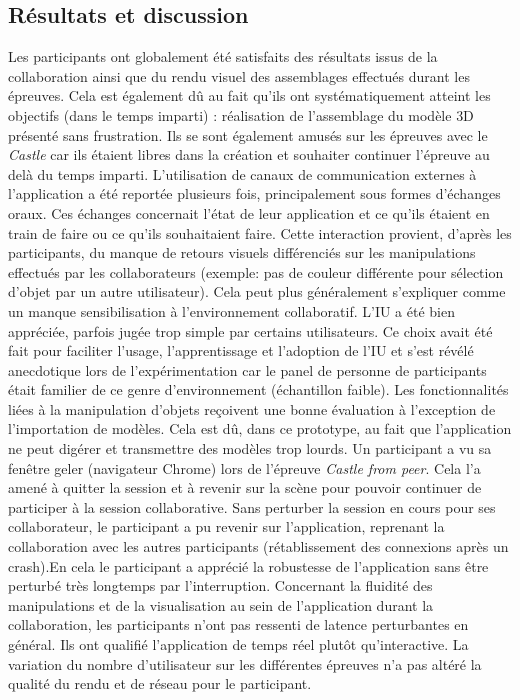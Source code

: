 \subsection{Résultats et discussion}
Les participants ont globalement été satisfaits des résultats issus de la 
collaboration ainsi que du rendu visuel des assemblages effectués durant les 
épreuves. Cela est également dû au fait qu'ils ont systématiquement atteint les 
objectifs (dans le temps imparti) : réalisation de l'assemblage du modèle \gls{3D} 
présenté sans frustration. Ils se sont également \og amusés\fg{} sur les épreuves
avec le \textit{Castle} car ils étaient libres dans la création et souhaiter continuer 
l'épreuve au delà du temps imparti. L'utilisation de canaux de communication 
externes à l'application a été reportée plusieurs fois, principalement sous formes 
d'échanges oraux. Ces échanges concernait l'état de leur application et ce qu'ils 
étaient en train de faire ou ce qu'ils souhaitaient faire. Cette interaction provient, 
d'après les participants, du manque de retours visuels différenciés sur les 
manipulations effectués par les collaborateurs (exemple: pas de couleur différente 
pour sélection d'objet par un autre utilisateur). Cela peut plus généralement 
s'expliquer comme un manque sensibilisation à l'environnement collaboratif. 
L'\gls{IU} a été bien appréciée, parfois jugée \og trop simple\fg{} par certains 
utilisateurs. Ce choix avait été fait pour faciliter l'usage, l'apprentissage et 
l'adoption de l'\gls{IU} et s'est révélé anecdotique lors de l'expérimentation car le 
panel de personne de participants était familier de ce genre 
d'environnement (échantillon faible).
Les fonctionnalités liées à la manipulation d'objets reçoivent une bonne évaluation 
à l'exception de l'importation de modèles. Cela est dû, dans ce prototype, au 
fait que l'application ne peut digérer et transmettre des modèles trop lourds. Un 
participant a vu sa fenêtre \og geler\fg{} (navigateur Chrome) lors de l'épreuve 
\textit{Castle from peer}. Cela l'a amené à quitter la session et à revenir sur la 
scène pour pouvoir continuer de participer à la session collaborative. Sans 
perturber la session en cours pour ses collaborateur, le participant a pu revenir sur 
l'application, reprenant la collaboration avec les autres participants (rétablissement 
des connexions après un crash).En cela le participant a apprécié la robustesse de 
l'application sans être perturbé très longtemps par l'interruption.
Concernant la fluidité des manipulations et de la visualisation au sein de 
l'application durant la collaboration, les participants n'ont pas ressenti de latence 
perturbantes en général. Ils ont qualifié l'application de \og temps réel\fg{} plutôt 
qu'\og interactive\fg{}. La variation du nombre d'utilisateur sur les différentes 
épreuves n'a pas altéré la qualité du rendu et de réseau pour le participant.

